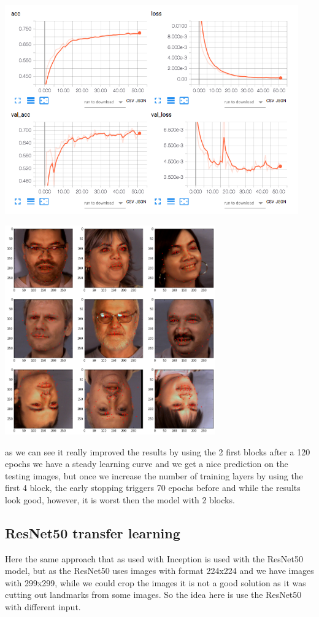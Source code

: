 \documentclass[11pt]{article}
\begin{document}
\begin{enumerate}
\centerline{\includegraphics[height=9cm]{./images/incep197Loss.png}}
\centerline{\includegraphics[height=9cm]{./images/incep197res.png}}


\pagebreak
as we can see it really improved the results by using the 2 first blocks after a
120 epochs we have a steady learning curve and we get a nice prediction on the
testing images, but once we increase the number of training layers by using
the first 4 block, the early stopping triggers 70 epochs before and while
the results look good, however, it is worst then the model with 2 blocks.
\end{enumerate}


\subsection{ResNet50 transfer learning}
\label{sec:orgeadfc91}
Here the same approach that as used with Inception is used with the ResNet50 \cite{he2016deep}  
model, but as the ResNet50 uses images with format 224x224 and we have images
with 299x299, while we could crop the images it is not a good solution as it
was cutting out landmarks from some images. So the idea here is use the
ResNet50 with different input. 
\end{document}
